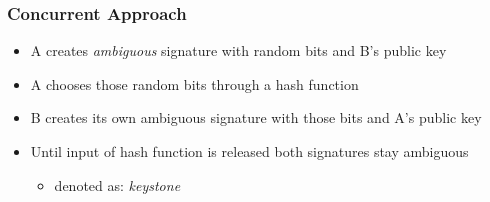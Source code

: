 \begin{frame}
	\frametitle{Concurrent Approach}
	
	\begin{itemize}[<+->]
		\setlength\itemsep{1em}
		\item A creates \textit{ambiguous} signature with random bits and B's public key
		\item A chooses those random bits through a hash function
		\item B creates its own ambiguous signature with those bits and A's public key
		\item Until input of hash function is released both signatures stay ambiguous
			\begin{itemize}
				\item denoted as: \textit{keystone}
			\end{itemize}
	\end{itemize}
\end{frame}